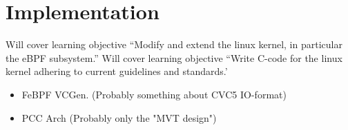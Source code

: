\section{Implementation}
\label{sec:implementation}

Will cover learning objective ``Modify and extend the linux kernel, in particular the eBPF subsystem.''
\newline
Will cover learning objective ``Write C-code for the linux kernel adhering to current guidelines and standards.'

\begin{itemize}
\item FeBPF VCGen. (Probably something about CVC5 IO-format)
\item PCC Arch  (Probably only the "MVT design")
\end{itemize}


